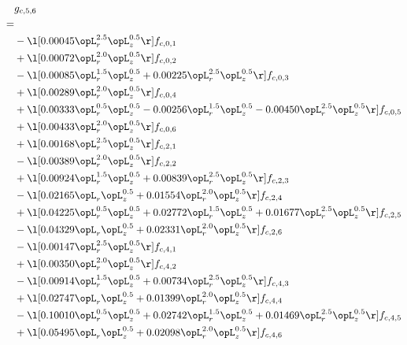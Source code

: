 \begin{alignat}{2} 
\label{eq:g_56_0} 
& g_{c,5,6} \nonumber \\ 
 = \\ 
& - \l[  0.00045 \opL_r^{2.5} \opL_z^{0.5}  \r] f_{c,0,1} \nonumber \\ 
& + \l[  0.00072 \opL_r^{2.0} \opL_z^{0.5}  \r] f_{c,0,2} \nonumber \\ 
& - \l[  0.00085 \opL_r^{1.5} \opL_z^{0.5} +  0.00225 \opL_r^{2.5} \opL_z^{0.5}  \r] f_{c,0,3} \nonumber \\ 
& + \l[  0.00289 \opL_r^{2.0} \opL_z^{0.5}  \r] f_{c,0,4} \nonumber \\ 
& + \l[  0.00333 \opL_r^{0.5} \opL_z^{0.5}   -0.00256 \opL_r^{1.5} \opL_z^{0.5}   -0.00450 \opL_r^{2.5} \opL_z^{0.5}  \r] f_{c,0,5} \nonumber \\ 
& + \l[  0.00433 \opL_r^{2.0} \opL_z^{0.5}  \r] f_{c,0,6} \nonumber \\ 
& + \l[  0.00168 \opL_r^{2.5} \opL_z^{0.5}  \r] f_{c,2,1} \nonumber \\ 
& - \l[  0.00389 \opL_r^{2.0} \opL_z^{0.5}  \r] f_{c,2,2} \nonumber \\ 
& + \l[  0.00924 \opL_r^{1.5} \opL_z^{0.5} +  0.00839 \opL_r^{2.5} \opL_z^{0.5}  \r] f_{c,2,3} \nonumber \\ 
& - \l[  0.02165 \opL_r \opL_z^{0.5} +  0.01554 \opL_r^{2.0} \opL_z^{0.5}  \r] f_{c,2,4} \nonumber \\ 
& + \l[  0.04225 \opL_r^{0.5} \opL_z^{0.5} +  0.02772 \opL_r^{1.5} \opL_z^{0.5} +  0.01677 \opL_r^{2.5} \opL_z^{0.5}  \r] f_{c,2,5} \nonumber \\ 
& - \l[  0.04329 \opL_r \opL_z^{0.5} +  0.02331 \opL_r^{2.0} \opL_z^{0.5}  \r] f_{c,2,6} \nonumber \\ 
& - \l[  0.00147 \opL_r^{2.5} \opL_z^{0.5}  \r] f_{c,4,1} \nonumber \\ 
& + \l[  0.00350 \opL_r^{2.0} \opL_z^{0.5}  \r] f_{c,4,2} \nonumber \\ 
& - \l[  0.00914 \opL_r^{1.5} \opL_z^{0.5} +  0.00734 \opL_r^{2.5} \opL_z^{0.5}  \r] f_{c,4,3} \nonumber \\ 
& + \l[  0.02747 \opL_r \opL_z^{0.5} +  0.01399 \opL_r^{2.0} \opL_z^{0.5}  \r] f_{c,4,4} \nonumber \\ 
& - \l[  0.10010 \opL_r^{0.5} \opL_z^{0.5} +  0.02742 \opL_r^{1.5} \opL_z^{0.5} +  0.01469 \opL_r^{2.5} \opL_z^{0.5}  \r] f_{c,4,5} \nonumber \\ 
& + \l[  0.05495 \opL_r \opL_z^{0.5} +  0.02098 \opL_r^{2.0} \opL_z^{0.5}  \r] f_{c,4,6} \nonumber \\ 

\end{alignat}
